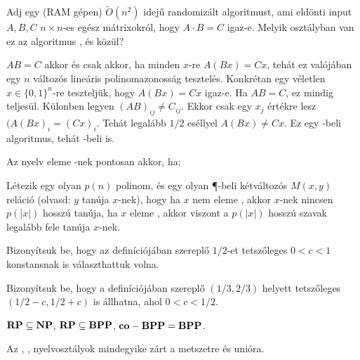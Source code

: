 \begin{Exercise}[counter={sorszam}, difficulty=0]
	Adj egy (RAM g\'epen) $\tilde O(n^2)$ idej\H u randomiz\'alt algoritmust, ami eld\"onti input $A,B,C$ $n\times n$-es eg\'esz m\'atrixokr\'ol, hogy $A\cdot B=C$ igaz-e. Melyik oszt\'alyban van ez az algoritmus \RP, \coRP \'es \BPP k\"oz\"ul?
\end{Exercise}	
\begin{Answer}
	$AB=C$ akkor \'es csak akkor, ha minden $x$-re $A(Bx)=Cx$, teh\'at ez val\'oj\'aban egy $n$ v\'altoz\'os line\'aris polinomazonoss\'ag tesztel\'es.
	Konkr\'etan egy v\'eletlen $x\in \{0,1\}^n$-re tesztelj\"uk, hogy $A(Bx)=Cx$ igaz-e.
	Ha $AB=C$, ez mindig teljes\"ul.
	K\"ulonben legyen $(AB)_{ij}\ne C_{ij}$.
	Ekkor csak egy $x_j$ \'ert\'ekre lesz $(A(Bx)_i=(Cx)_i$.
	Teh\'at legal\'abb $1/2$ es\'ellyel $A(Bx)\ne Cx$.
	Ez egy \coRP-beli algoritmus, teh\'at \BPP-beli is.
\end{Answer}

\begin{Exercise}[counter={sorszam}, difficulty=0]
	Az \Language nyelv eleme \RP-nek pontosan akkor, ha:
	
	Létezik egy olyan $p(n)$ polinom, és egy olyan \P-beli kétváltozós $M(x,y)$ reláció
	(olvasd: $y$ tanúja $x$-nek), hogy ha $x$ nem eleme \Language, akkor $x$-nek nincsen $p(|x|)$
	hosszú tanúja, ha $x$ eleme \Language, akkor viszont a $p(|x|)$ hosszú szavak legalább
	fele tanúja $x$-nek.
\end{Exercise}


\begin{Exercise}[counter={sorszam}, difficulty=0]
	Bizonyítsuk be, hogy az \RP definíciójában szereplő $1/2$-et tetszőleges
	$0<c<1$ konstansnak is választhattuk volna.
\end{Exercise}


\begin{Exercise}[counter={sorszam}, difficulty=0]
	Bizonyítsuk be, hogy a \BPP definíciójában szereplő $(1/3,2/3)$ helyett
	tetszőleges $(1/2-c,1/2+c)$ is állhatna, ahol $0<c<1/2$.
\end{Exercise}


\begin{Exercise}[counter={sorszam}, difficulty=-1]
	$\mbox{\ensuremath{\mathbf{RP}}} \subseteq \mbox{\ensuremath{\mathbf{NP}}}$, $\mbox{\ensuremath{\mathbf{RP}}} \subseteq \mbox{\ensuremath{\mathbf{BPP}}}$, $\mbox{\ensuremath{\mathbf{co-BPP}}} = \mbox{\ensuremath{\mathbf{BPP}}}$.
\end{Exercise}


\begin{Exercise}[counter={sorszam}, difficulty=0]
	Az \RP, \BPP, \ZPP nyelvosztályok mindegyike zárt a metszetre és unióra.
\end{Exercise}


